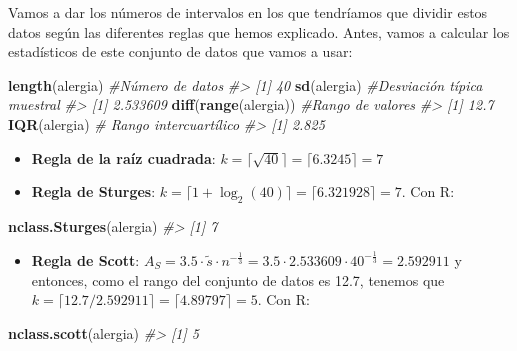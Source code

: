 \documentclass[
]{book}
\newenvironment{Shaded}{\begin{snugshade}}{\end{snugshade}}
\newcommand{\CommentTok}[1]{\textcolor[rgb]{0.56,0.35,0.01}{\textit{#1}}}
\newcommand{\KeywordTok}[1]{\textcolor[rgb]{0.13,0.29,0.53}{\textbf{#1}}}
\newcommand{\NormalTok}[1]{#1}
\providecommand{\tightlist}{%
  \setlength{\itemsep}{0pt}\setlength{\parskip}{0pt}}
\theoremstyle{definition}
\theoremstyle{definition}
\theoremstyle{definition}
\theoremstyle{remark}
\begin{document}
Vamos a dar los números de intervalos en los que tendríamos que dividir estos datos según las diferentes reglas que hemos explicado. Antes, vamos a calcular los estadísticos de este conjunto de datos que vamos a usar:

\begin{Shaded}
\begin{Highlighting}[]
\KeywordTok{length}\NormalTok{(alergia)  }\CommentTok{\#Número de datos}
\CommentTok{\#\textgreater{} [1] 40}
\KeywordTok{sd}\NormalTok{(alergia) }\CommentTok{\#Desviación típica muestral}
\CommentTok{\#\textgreater{} [1] 2.533609}
\KeywordTok{diff}\NormalTok{(}\KeywordTok{range}\NormalTok{(alergia))  }\CommentTok{\#Rango de valores}
\CommentTok{\#\textgreater{} [1] 12.7}
\KeywordTok{IQR}\NormalTok{(alergia) }\CommentTok{\# Rango intercuartílico}
\CommentTok{\#\textgreater{} [1] 2.825}
\end{Highlighting}
\end{Shaded}

\begin{itemize}
\item
  \textbf{Regla de la raíz cuadrada}: \(k= \lceil \sqrt{40} \rceil =\lceil 6.3245\rceil=7\)
\item
  \textbf{Regla de Sturges}: \(k= \lceil 1+\log_{2}(40)\rceil= \lceil 6.321928\rceil=7\). Con R:
\end{itemize}

\begin{Shaded}
\begin{Highlighting}[]
\KeywordTok{nclass.Sturges}\NormalTok{(alergia)}
\CommentTok{\#\textgreater{} [1] 7}
\end{Highlighting}
\end{Shaded}

\begin{itemize}
\tightlist
\item
  \textbf{Regla de Scott}: \(A_{S}= 3.5\cdot \widetilde{s}\cdot n^{-\frac{1}{3}}=3.5\cdot 2.533609 \cdot 40^{-\frac{1}{3}}= 2.592911\) y entonces, como el rango del conjunto de datos es 12.7, tenemos que \(k=\lceil {12.7}/{2.592911}\rceil=\lceil 4.89797\rceil=5\). Con R:
\end{itemize}

\begin{Shaded}
\begin{Highlighting}[]
\KeywordTok{nclass.scott}\NormalTok{(alergia)}
\CommentTok{\#\textgreater{} [1] 5}
\end{Highlighting}
\end{Shaded}
\end{document}
